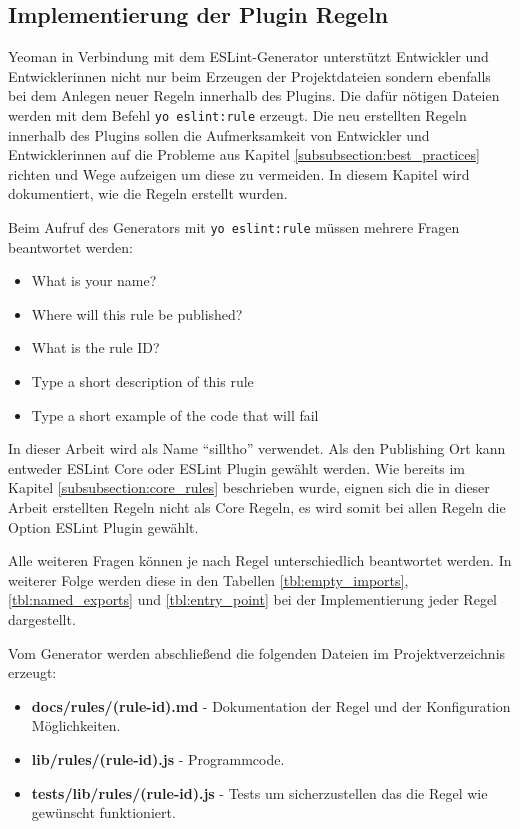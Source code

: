\subsection{Implementierung der Plugin Regeln}
Yeoman in Verbindung mit dem ESLint-Generator unterstützt Entwickler und Entwicklerinnen nicht nur beim Erzeugen der Projektdateien sondern ebenfalls bei dem Anlegen neuer Regeln innerhalb des Plugins. Die dafür nötigen Dateien werden mit dem Befehl \lstinline{yo eslint:rule} erzeugt. Die neu erstellten Regeln innerhalb des Plugins sollen die Aufmerksamkeit von Entwickler und Entwicklerinnen auf die Probleme aus Kapitel \ref{subsubsection:best_practices} richten und Wege aufzeigen um diese zu vermeiden. In diesem Kapitel wird dokumentiert, wie die Regeln erstellt wurden. 

Beim Aufruf des Generators mit \lstinline{yo eslint:rule} müssen mehrere Fragen beantwortet werden:

\begin{itemize}
	\item What is your name?
    \item Where will this rule be published?
    \item What is the rule ID?
    \item Type a short description of this rule
    \item Type a short example of the code that will fail
\end{itemize}

In dieser Arbeit wird als Name ``silltho'' verwendet. Als den Publishing Ort kann entweder ESLint Core oder ESLint Plugin gewählt werden. Wie bereits im Kapitel \ref{subsubsection:core_rules} beschrieben wurde, eignen sich die in dieser Arbeit erstellten Regeln nicht als Core Regeln, es wird somit bei allen Regeln die Option ESLint Plugin gewählt. 

Alle weiteren Fragen können je nach Regel unterschiedlich beantwortet werden. In weiterer Folge werden diese in den Tabellen \ref{tbl:empty_imports}, \ref{tbl:named_exports} und \ref{tbl:entry_point} bei der Implementierung jeder Regel dargestellt.

Vom Generator werden abschließend die folgenden Dateien im Projektverzeichnis erzeugt:
\begin{itemize}
	\item \textbf{docs/rules/(rule-id).md} - Dokumentation der Regel und der Konfiguration Möglichkeiten.
    \item \textbf{lib/rules/(rule-id).js} - Programmcode.
    \item \textbf{tests/lib/rules/(rule-id).js} - Tests um sicherzustellen das die Regel wie gewünscht funktioniert.
\end{itemize}

